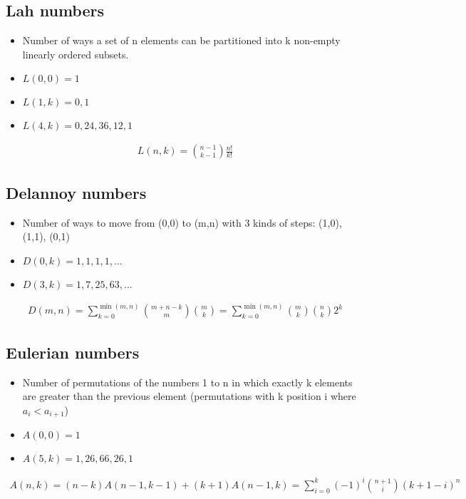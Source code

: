 \documentclass{article}
\begin{document}
\subsection{Lah numbers}
\begin{itemize}
    \item Number of ways a set of n elements can be partitioned into k non-empty linearly ordered subsets.
    \item $L(0, 0) = 1$
    \item $L(1, k) = 0, 1$
    \item $L(4, k) = 0, 24, 36, 12, 1$
\end{itemize}
\begin{align*}
    L(n, k) = \binom{n-1}{k-1} \frac{n!}{k!}
\end{align*}

\subsection{Delannoy numbers}
\begin{itemize}
    \item Number of ways to move from (0,0) to (m,n) with 3 kinds of steps: (1,0), (1,1), (0,1)
    \item $D(0, k) = 1, 1, 1, 1, ...$
    \item $D(3, k) = 1, 7, 25, 63, ...$
\end{itemize}
\begin{align*}
    D(m,n) = \sum_{k=0}^{\min(m,n)} \binom{m+n-k}{m} \binom{m}{k} = \sum_{k=0}^{\min(m,n)} \binom{m}{k} \binom{n}{k} 2^k
\end{align*}

\subsection{Eulerian numbers}
\begin{itemize}
    \item Number of permutations of the numbers 1 to n in which exactly k elements are greater than the previous element (permutations with k position i where $a_i < a_{i + 1}$)
    \item $A(0, 0) = 1$
    \item $A(5, k) = 1, 26, 66, 26, 1$
\end{itemize}
\begin{align*}
    A(n,k) = (n - k)A(n-1, k-1) + (k+1)A(n-1, k) = \sum_{i=0}^{k} (-1)^i \binom{n+1}{i}(k+1-i)^n
\end{align*}
\end{document}
